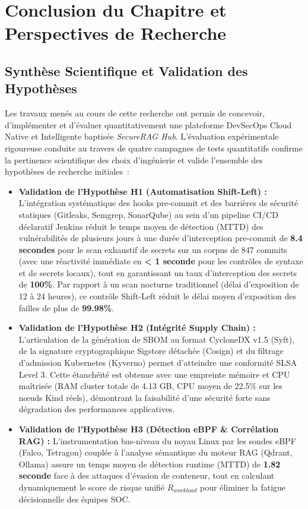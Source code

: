 \section{Conclusion du Chapitre et Perspectives de Recherche}
\label{sec:conclusion_sprint}

\subsection{Synthèse Scientifique et Validation des Hypothèses}

Les travaux menés au cours de cette recherche ont permis de concevoir, d'implémenter et d'évaluer quantitativement une plateforme DevSecOps Cloud Native et Intelligente baptisée \textit{SecureRAG Hub}. L'évaluation expérimentale rigoureuse conduite au travers de quatre campagnes de tests quantitatifs confirme la pertinence scientifique des choix d'ingénierie et valide l'ensemble des hypothèses de recherche initiales~:

\begin{itemize}
    \item \textbf{Validation de l'Hypothèse H1 (Automatisation Shift-Left) : } L'intégration systématique des hooks pre-commit et des barrières de sécurité statiques (Gitleaks, Semgrep, SonarQube) au sein d'un pipeline CI/CD déclaratif Jenkins réduit le temps moyen de détection (MTTD) des vulnérabilités de plusieurs jours à une durée d'interception pre-commit de \textbf{8.4 secondes} pour le scan exhaustif de secrets sur un corpus de 847 commits (avec une réactivité immédiate en \textbf{< 1 seconde} pour les contrôles de syntaxe et de secrets locaux), tout en garantissant un taux d'interception des secrets de \textbf{100\%}. Par rapport à un scan nocturne traditionnel (délai d'exposition de 12 à 24 heures), ce contrôle Shift-Left réduit le délai moyen d'exposition des failles de plus de \textbf{99.98\%}.
    \item \textbf{Validation de l'Hypothèse H2 (Intégrité Supply Chain) : } L'articulation de la génération de SBOM au format CycloneDX v1.5 (Syft), de la signature cryptographique Sigstore détachée (Cosign) et du filtrage d'admission Kubernetes (Kyverno) permet d'atteindre une conformité SLSA Level 3. Cette étanchéité est obtenue avec une empreinte mémoire et CPU maîtrisée (RAM cluster totale de 4.13 GB, CPU moyen de 22.5\% sur les nœuds Kind réels), démontrant la faisabilité d'une sécurité forte sans dégradation des performances applicatives.
    \item \textbf{Validation de l'Hypothèse H3 (Détection eBPF \& Corrélation RAG) : } L'instrumentation bas-niveau du noyau Linux par les sondes eBPF (Falco, Tetragon) couplée à l'analyse sémantique du moteur RAG (Qdrant, Ollama) assure un temps moyen de détection runtime (MTTD) de \textbf{1.82 seconde} face à des attaques d'évasion de conteneur, tout en calculant dynamiquement le score de risque unifié $R_{workload}$ pour éliminer la fatigue décisionnelle des équipes SOC.
\end{itemize}

